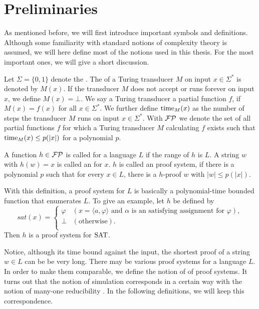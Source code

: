 \chapter{Preliminaries}
  As mentioned before, we will first introduce important symbols and definitions. Although some familiarity with standard notions of complexity theory is assumed, we will here define most of the notions used in this thesis. For the most important ones, we will give a short discussion.

  Let \(\Sigma = \{ 0, 1 \}\) denote the . The  of a Turing transducer \(M\) on input \(x \in \Sigma^*\) is denoted by \(M(x)\). If the transducer \(M\) does not accept or runs forever on input \(x\), we define \(M(x) = \bot\). We say a Turing transducer  a partial function \(f\), if \(M(x) = f(x)\) for all \(x \in \Sigma^*\). We further define \(\operatorname{time}_M(x)\) as the number of steps the transducer \(M\) runs on input \(x \in \Sigma^*\). With \(\mathcal{FP}\) we denote the set of all partial functions \(f\) for which a Turing transducer \(M\) calculating \(f\) exists such that \(\operatorname{time}_M(x) \leq p(|x|)\) for a polynomial \(p\).

  \begin{definition}
    A function \(h \in \mathcal{FP}\) is called  for a language \(L\) if the range of \(h\) is \(L\). A string \(w\) with \(h(w) = x\) is called an  for \(x\). \(h\) is called an  proof system, if there is a polynomial \(p\) such that for every \(x \in L\), there is a \(h\)-proof \(w\) with \(|w| \leq p(|x|)\).
  \end{definition}

  With this definition, a proof system for \(L\) is basically a polynomial-time bounded function that enumerates \(L\). To give an example, let \(h\) be defined by
    \[
       sat(x) =
       \begin{cases}
         \varphi & (x = \langle a, \varphi \rangle \text{ and \(\alpha\) is an satisfying assignment for \(\varphi\)}), \\
         \perp & (\text{otherwise}). \\
       \end{cases}
    \]
  Then \(h\) is a proof system for \(\text{SAT}\). 
  
  Notice, although its time bound against the input, the shortest proof of a string \(w \in L\) can be be very long. There may be various proof systems for a language \(L\). In order to make them comparable, we define the notion of  of proof systems. It turns out that the notion of simulation corresponds in a certain way with the notion of many-one reducibility \cite{KM00}. In the following definitions, we will keep this correspondence.
  
